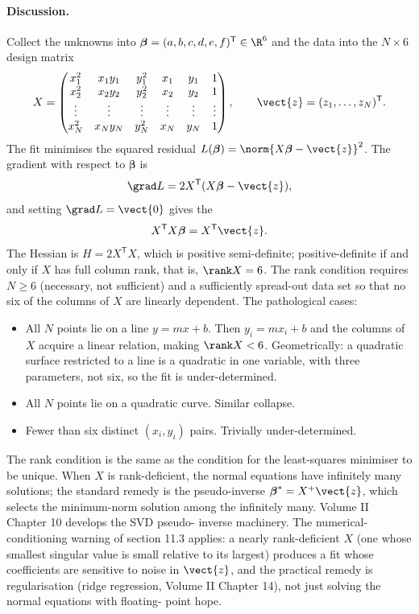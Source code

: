 \begin{exercise}
\paragraph{Discussion.} Collect the unknowns into $\boldsymbol{
\beta} = (a, b, c, d, e, f)^{\mathsf{T}} \in \R^{6}$ and the data
into the $N \times 6$ design matrix
\[
X = \begin{pmatrix}
x_{1}^{2} & x_{1} y_{1} & y_{1}^{2} & x_{1} & y_{1} & 1 \\
x_{2}^{2} & x_{2} y_{2} & y_{2}^{2} & x_{2} & y_{2} & 1 \\
\vdots & \vdots & \vdots & \vdots & \vdots & \vdots \\
x_{N}^{2} & x_{N} y_{N} & y_{N}^{2} & x_{N} & y_{N} & 1
\end{pmatrix},
\qquad
\vect{z} = (z_{1}, \ldots, z_{N})^{\mathsf{T}}.
\]
The fit minimises the squared residual
$L(\boldsymbol{\beta}) = \norm{X \boldsymbol{\beta} - \vect{z}}^{2}$.
The gradient with respect to $\boldsymbol{\beta}$ is
\[
\grad L = 2 X^{\mathsf{T}}(X \boldsymbol{\beta} - \vect{z}),
\]
and setting $\grad L = \vect{0}$ gives the 
\[
X^{\mathsf{T}} X \boldsymbol{\beta} = X^{\mathsf{T}} \vect{z}.
\]
The Hessian is $H = 2 X^{\mathsf{T}} X$, which is positive
semi-definite; positive-definite if and only if $X$ has full column
rank, that is, $\rank X = 6$. The rank condition requires $N \geq
6$ (necessary, not sufficient) and a sufficiently spread-out data
set so that no six of the columns of $X$ are linearly dependent.
The pathological cases:
\begin{itemize}[leftmargin=*]
  \item All $N$ points lie on a line $y = m x + b$. Then $y_{i} =
    m x_{i} + b$ and the columns of $X$ acquire a linear relation,
    making $\rank X < 6$. Geometrically: a quadratic surface
    restricted to a line is a quadratic in one variable, with three
    parameters, not six, so the fit is under-determined.
  \item All $N$ points lie on a quadratic curve. Similar collapse.
  \item Fewer than six distinct $(x_{i}, y_{i})$ pairs. Trivially
    under-determined.
\end{itemize}
The rank condition is the same as the condition for the
least-squares minimiser to be unique. When $X$ is rank-deficient,
the normal equations have infinitely many solutions; the standard
remedy is the pseudo-inverse $\boldsymbol{\beta}^{*} =
X^{+}\vect{z}$, which selects the minimum-norm solution among the
infinitely many. Volume II Chapter 10 develops the SVD pseudo-
inverse machinery. The numerical-conditioning warning of section
11.3 applies: a nearly rank-deficient $X$ (one whose smallest
singular value is small relative to its largest) produces a fit
whose coefficients are sensitive to noise in $\vect{z}$, and the
practical remedy is regularisation (ridge regression, Volume II
Chapter 14), not just solving the normal equations with floating-
point hope.
\end{exercise}

